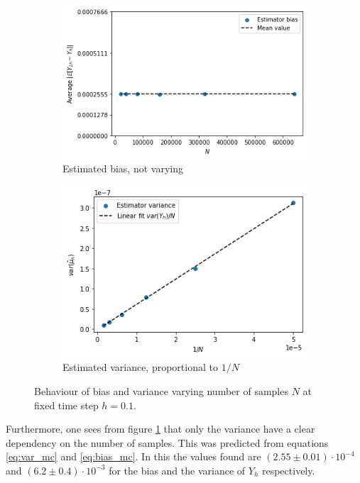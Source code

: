 \begin{figure}[H]
\begin{subfigure}{0.5\textwidth}
\includegraphics[width=\textwidth]{graphics/b/bias_N.png}
\caption{Estimated bias, not varying}
\end{subfigure}
\begin{subfigure}{0.5\textwidth}
\includegraphics[width=\textwidth]{graphics/b/variance_N.png}
\caption{Estimated variance, proportional to $1/N$}
\end{subfigure}
\caption{Behaviour of bias and variance varying number of samples $N$ at fixed time step $h = 0.1$.}
\label{fig:weak_var_mc_N}
\end{figure}

Furthermore, one sees from figure \ref{fig:weak_var_mc_N} that only the variance have a clear dependency on the number of samples. This was predicted from equations \ref{eq:var_mc} and \ref{eq:bias_mc}.
In this the values found are $(2.55 \pm 0.01) \cdot 10^{-4}$ and $(6.2 \pm 0.4) \cdot 10^{-3}$ for the bias and the variance of $Y_h$ respectively.


